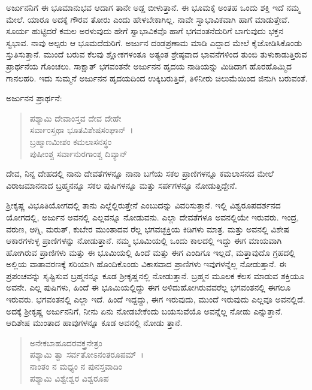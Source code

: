 ಅರ್ಜುನನಿಗೆ ಈ ಭೂಮಾನುಭವ ಆದಾಗ ತಾನೇ ಅಡ್ಡ ಬೀಳುತ್ತಾನೆ. ಈ ಭೂಮಕ್ಕೆ ಅಂತಹ ಒಂದು ಶಕ್ತಿ ಇದೆ ನಮ್ಮ ಮೇಲೆ. ಯಾರೂ ಅದಕ್ಕೆ ಗೌರವ ತೋರು ಎಂದು ಹೇಳಬೇಕಾಗಿಲ್ಲ. ನಾವೇ ಸ್ವಾಭಾವಿಕವಾಗಿ ಹಾಗೆ ಮಾಡುತ್ತೇವೆ. ಸೂರ್ಯ ಹುಟ್ಟಿದರೆ ಕಮಲ ಅರಳುವುದು ಹೇಗೆ ಸ್ವಾಭಾವಿಕವೊ ಹಾಗೆ ಭಗವಂತನೆದುರಿಗೆ ಬಾಗುವುದು ಭಕ್ತನ ಸ್ವಭಾವ. ನಾವು ಅಲ್ಪರು ಆ ಭೂಮದೆದುರಿಗೆ. ಅರ್ಜುನ ದಂಡಪ್ರಣಾಮ ಮಾಡಿ ಎದ್ದಾದ ಮೇಲೆ ಕೈಜೋಡಿಸಿಕೊಂಡು ಸ್ತುತಿಸುತ್ತಾನೆ. ಮುಂದೆ ಬರುವ ಕೆಲವು ಶ್ಲೋಕಗಳಂತೂ ಅತ್ಯಂತ ಶ್ರೇಷ್ಠವಾದ ಭಾವನೆಗಳಿಂದ ತುಂಬಿ ತುಳುಕಾಡುತ್ತಿರುವ ಪ್ರಾರ್ಥನೆಯ ಗೊಂಚಲು. ಸಾಕ್ಷಾತ್ ಭಗವಂತನೇ ಅರ್ಜುನನ ಹೃದಯ ನಾಡಿಯನ್ನು ಮಿಡಿದಾಗ ಹೊರಹೊಮ್ಮಿದ ಗಾನಲಹರಿ. ಇದು ಸುಮ್ಮನೆ ಅರ್ಜುನನ ಹೃದಯದಿಂದ ಉಕ್ಕಿಬರುತ್ತಿದೆ, ತಿಳಿನೀರು ಚಿಲುಮೆಯಿಂದ ಜಿನುಗಿ ಬರುವಂತೆ.

ಅರ್ಜುನನ ಪ್ರಾರ್ಥನೆ:

\begin{verse}
ಪಶ್ಯಾಮಿ ದೇವಾಂಸ್ತವ ದೇವ ದೇಹೇ\\ ಸರ್ವಾಂಸ್ತಥಾ ಭೂತವಿಶೇಷಸಂಘಾನ್~।\\ಬ್ರಹ್ಮಾಣಮೀಶಂ ಕಮಲಾಸನಸ್ಥಂ\\ ಪುಷೀಂಶ್ಚ ಸರ್ವಾನುರಗಾಂಶ್ಚ ದಿವ್ಯಾನ್ 
\end{verse}

{\small ದೇವ, ನಿನ್ನ ದೇಹದಲ್ಲಿ ನಾನು ದೇವತೆಗಳನ್ನೂ ನಾನಾ ಬಗೆಯ ಸಕಲ ಪ್ರಾಣಿಗಳನ್ನೂ ಕಮಲಾಸನದ ಮೇಲೆ ವಿರಾಜಮಾನನಾದ ಬ್ರಹ್ಮನನ್ನೂ ಸಕಲ ಪುಷಿಗಳನ್ನೂ ಮತ್ತು ಸರ್ಪಗಳನ್ನೂ ನೋಡುತ್ತಿದ್ದೇನೆ.}

ಶ‍್ರೀಕೃಷ್ಣ ವಿಭೂತಿಯೋಗದಲ್ಲಿ ತಾನು ಎಲ್ಲೆಲ್ಲಿರುತ್ತೇನೆ ಎಂಬುದನ್ನು ವಿವರಿಸುತ್ತಾನೆ. ಇಲ್ಲಿ ವಿಶ್ವರೂಪದರ್ಶನದ ಯೋಗದಲ್ಲಿ, ಅರ್ಜುನ ಅವನಲ್ಲಿ ಎಲ್ಲವನ್ನೂ ನೋಡುವನು. ಎಲ್ಲಾ ದೇವತೆಗಳೂ ಅವನಲ್ಲಿಯೇ ಇರುವರು. ಇಂದ್ರ, ವರುಣ, ಅಗ್ನಿ, ಮರುತ್, ಕುಬೇರ ಮುಂತಾದವ ರೆಲ್ಲ ಭಗವಚ್ಛಕ್ತಿಯ ಕಿಡಿಗಳು ಮಾತ್ರ. ಮತ್ತು ಅವನಲ್ಲಿ ವಿಶೇಷ ಆಕಾರಗಳುಳ್ಳ ಪ್ರಾಣಿಗಳನ್ನು ನೋಡುತ್ತಾನೆ. ನಮ್ಮ ಭೂಮಿಯಲ್ಲಿ ಒಂದು ಕಾಲದಲ್ಲಿ ಇದ್ದು ಈಗ ಮಾಯವಾಗಿ ಹೋಗಿರುವ ಪ್ರಾಣಿಗಳು ಮತ್ತು ಈ ಭೂಮಿಯಲ್ಲಿ ಹಿಂದೆ ಮತ್ತು ಈಗ ಎಂದಿಗೂ ಇಲ್ಲದೆ, ಮತ್ತಾವುದೊ ಗ್ರಹದಲ್ಲಿ ಅಲ್ಲಿಯ ವಾತಾವರಣಕ್ಕೆ ಸರಿಯಾಗಿ ಹೊಂದಿಕೊಂಡು ವಿಕಾಸವಾದ ಪ್ರಾಣಿಗಳು ಇವುಗಳನ್ನೆಲ್ಲ ನೋಡುತ್ತಾನೆ. ಈ ಪ್ರಪಂಚವನ್ನು ಸೃಷ್ಟಿಸುವ ಬ್ರಹ್ಮನನ್ನೂ ಕೂಡ ಶ‍್ರೀಕೃಷ್ಣನಲ್ಲಿ ನೋಡುತ್ತಾನೆ. ಬ್ರಹ್ಮನ ಮೂಲಕ ಕೆಲಸ ಮಾಡುವ ಶಕ್ತಿಯೂ ಅವನೇ. ಎಲ್ಲ ಪುಷಿಗಳು, ಹಿಂದೆ ಈ ಭೂಮಿಯಲ್ಲಿದ್ದು ಈಗ ಅಳಿದುಹೋಗಿರುವವರೆಲ್ಲ ಭಗವಂತನಲ್ಲಿ ಈಗಲೂ ಇರುವರು. ಭಗವಂತನಲ್ಲಿ ಎಲ್ಲಾ ಇದೆ. ಹಿಂದೆ ಇದ್ದದ್ದು, ಈಗ ಇರುವುದು, ಮುಂದೆ ಇರುವುದು ಎಲ್ಲವೂ ಅವನಲ್ಲಿದೆ. ಅದಕ್ಕೆ ಶ‍್ರೀಕೃಷ್ಣ ಅರ್ಜುನನಿಗೆ, ನೀನು ಏನು ನೋಡಬೇಕೆಂದು ಬಯಸುವೆಯೊ ಅವನ್ನೆಲ್ಲ ನೋಡು ಎನ್ನುತ್ತಾನೆ. ಆದಿಶೇಷ ಮುಂತಾದ ಹಾವುಗಳನ್ನೂ ಕೂಡ ಅವನಲ್ಲಿ ನೋಡು ತ್ತಾನೆ.

\begin{verse}
ಅನೇಕಬಾಹೂದರವಕ್ತ್ರನೇತ್ರಂ \\ ಪಶ್ಯಾಮಿ ತ್ವಾ ಸರ್ವತೋಽನಂತರೂಪಮ್~।\\ನಾಂತಂ ನ ಮಧ್ಯಂ ನ ಪುನಸ್ತವಾದಿಂ\\ ಪಶ್ಯಾಮಿ ವಿಶ್ವೇಶ್ವರ ವಿಶ್ವರೂಪ 
\end{verse}

